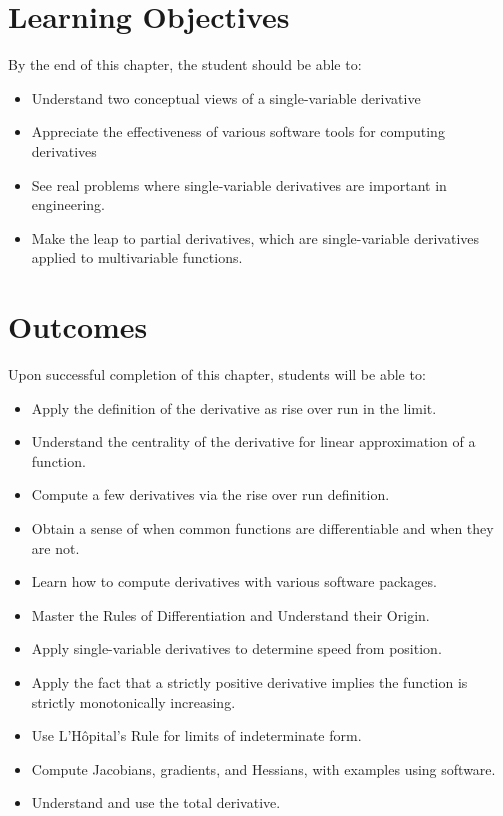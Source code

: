\section*{Learning Objectives}
By the end of this chapter, the student should be able to:
\begin{itemize}
\item Understand two conceptual views of a single-variable derivative
\item Appreciate the effectiveness of various software tools for computing derivatives
\item See real problems where single-variable derivatives are important in engineering.
\item Make the leap to partial derivatives, which are single-variable derivatives applied to multivariable functions.
\end{itemize}

\section*{Outcomes}
Upon successful completion of this chapter, students will be able to:
\begin{itemize}
 \item Apply the definition of the derivative as rise over run in the limit.
 \item Understand the centrality of the derivative for linear approximation of a function.
 \item Compute a few derivatives via the rise over run definition.
 \item Obtain a sense of when common functions are differentiable and when they are not.
 \item Learn how to compute derivatives with various software packages.
 \item Master the Rules of Differentiation and Understand their Origin.
  \item Apply single-variable derivatives to determine speed from position.
  \item Apply the fact that a strictly positive derivative implies the function is strictly monotonically increasing.
 \item Use L'H\^opital's Rule for limits of indeterminate form.
  \item Compute Jacobians, gradients, and Hessians, with examples using software. 
\item Understand and use the total derivative.
 \end{itemize}


